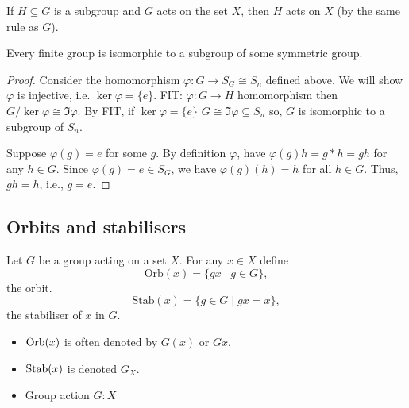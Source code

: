 \documentclass[10pt, a4paper]{article}
\begin{document}
\begin{remark}
    If $H \subseteq G$ is a subgroup and $G$ acts on the set $X$,
    then $H$ acts on $X$
    (by the same rule as $G$).
\end{remark}

\begin{theorem}[Caley]
    Every finite group is isomorphic to a subgroup of some symmetric group.

    \begin{proof}
        Consider the homomorphism $\varphi : G \to S_G \cong S_n$ defined above.
        We will show $\varphi$ is injective,
        i.e. $\ker{\varphi} = \{e\}$.
        FIT:
        $\varphi : G \to H$ homomorphism then $G / \ker{\varphi} \cong \Im{\varphi}$.
        By FIT,
        if $\ker{\varphi} = \{e\}$ $G \cong \Im{\varphi} \subseteq S_n$ so,
        $G$ is isomorphic to a subgroup of $S_n$.

        Suppose $\varphi(g) = e$ for some $g$.
        By definition $\varphi$,
        have $\varphi(g)h = g * h = gh$ for any $h \in G$.
        Since $\varphi(g) = e \in S_G$,
        we have $\varphi(g)(h) = h$ for all $h \in G$.
        Thus,
        $gh = h$,
        i.e.,
        $g = e$.
    \end{proof}
\end{theorem}

\subsection{Orbits and stabilisers}

\begin{definition}
    Let $G$ be a group acting on a set $X$.
    For any $x \in X$ define
    \[
    \mathrm{Orb}(x) = \{gx \mid g \in G\},
    \]
    the orbit.
    \[
    \mathrm{Stab}(x) = \{g \in G \mid gx = x\},
    \]
    the stabiliser of $x$ in $G$.
\end{definition}

\begin{remark}\phantom{}
    \begin{itemize}
        \item $\operatorname{Orb}(x)$ is often denoted by $G(x)$ or $Gx$.

        \item $\operatorname{Stab}(x)$ is denoted $G_X$.

        \item Group action $G : X$
    \end{itemize}
\end{remark}
\end{document}
